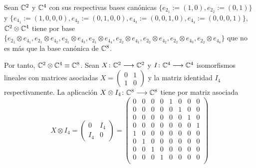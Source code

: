 \begin{example} Sean $\mathbb{C}^2$ y $\mathbb{C}^4$ con sus respectivas bases canónicas $\{e_{2_1}:=(1,0),e_{2_2}:=(0,1)\}$ y $\{e_{4_1}:=(1,0,0,0),e_{4_2}:=(0,1,0,0), e_{4_3}:=(0,0,1,0),e_{4_4}:=(0,0,0,1)\}$, $\mathbb{C}^2\otimes\mathbb{C}^4$ tiene por base $\{e_{2_1}\otimes e_{4_1},e_{2_1}\otimes e_{4_2},e_{2_1}\otimes e_{4_3},e_{2_1}\otimes e_{4_4},e_{2_2}\otimes e_{4_1},e_{2_2}\otimes e_{4_2},e_{2_2}\otimes e_{4_3},e_{2_2}\otimes e_{4_4}\}$ que no es más que la base canónica de $\mathbb{C}^8$.

Por tanto, $\mathbb{C}^2\otimes\mathbb{C}^4\equiv\mathbb{C}^8$. Sean $X\colon \mathbb{C}^2\longrightarrow \mathbb{C}^2$ y $I\colon \mathbb{C}^4\longrightarrow \mathbb{C}^4$ isomorfismos lineales con matrices asociadas $X=\left(\begin{matrix}
0&1\\1&0\end{matrix}\right)$ y la matriz identidad $I_4$ respectivamente. La aplicación $X\otimes I_4\colon \mathbb{C}^8\longrightarrow \mathbb{C}^8$ tiene por matriz asociada
\[
X\otimes I_4=
\left(\begin{matrix}
0&I_4\\
I_4&0
\end{matrix}\right)
=
\left(\begin{matrix}
0&0&0&0&1&0&0&0\\
0&0&0&0&0&1&0&0\\
0&0&0&0&0&0&1&0\\
0&0&0&0&0&0&0&1\\
1&0&0&0&0&0&0&0\\
0&1&0&0&0&0&0&0\\
0&0&1&0&0&0&0&0\\
0&0&0&1&0&0&0&0\\
\end{matrix}\right)\]


\end{example}
